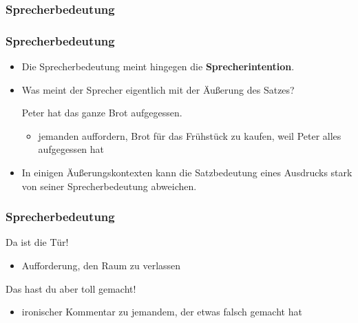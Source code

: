 %
\subsubsection{Sprecherbedeutung}
%

\begin{frame}
\frametitle{Sprecherbedeutung}

\begin{itemize}
	\item Die Sprecherbedeutung meint hingegen die \textbf{Sprecherintention}.
	\medskip
	\item Was meint der Sprecher eigentlich mit der Äußerung des Satzes?

	\ea \label{ex1c}Peter hat das ganze Brot aufgegessen.
	\z

\pause 

	\begin{itemize}
		\item jemanden auffordern, Brot für das Frühstück zu kaufen, weil Peter alles aufgegessen hat
	\end{itemize}
	
	\medskip
	
	\item In einigen Äußerungskontexten kann die Satzbedeutung eines Ausdrucks stark von seiner Sprecherbedeutung abweichen.
\end{itemize}

\end{frame}



\begin{frame}
\frametitle{Sprecherbedeutung}


	\ea \label{ex2} Da ist die Tür!
	\z
	\pause
\begin{itemize}
		\item  Aufforderung, den Raum zu verlassen

\end{itemize}	

\pause
	
	\ea \label{ex3}Das hast du aber toll gemacht!
	\z
	\pause
\begin{itemize}
		\item  ironischer Kommentar zu jemandem, der etwas falsch gemacht hat	
\end{itemize}
	
\end{frame}


